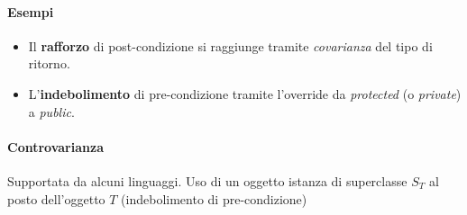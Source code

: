 \paragraph{Esempi} 
\begin{itemize}
    \item Il \textbf{rafforzo} di post-condizione si raggiunge tramite \textit{covarianza} del tipo di ritorno.
    \item L'\textbf{indebolimento} di pre-condizione tramite l'override da \textit{protected} (o \textit{private}) a \textit{public}.
\end{itemize}

\paragraph{Controvarianza} Supportata da alcuni linguaggi. Uso di un oggetto istanza di superclasse $S_T$ al posto dell'oggetto $T$ (indebolimento di pre-condizione)

\newpage